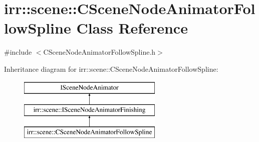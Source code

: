 \hypertarget{classirr_1_1scene_1_1_c_scene_node_animator_follow_spline}{\section{irr\-:\-:scene\-:\-:C\-Scene\-Node\-Animator\-Follow\-Spline Class Reference}
\label{classirr_1_1scene_1_1_c_scene_node_animator_follow_spline}
}


{\ttfamily \#include $<$C\-Scene\-Node\-Animator\-Follow\-Spline.\-h$>$}

Inheritance diagram for irr\-:\-:scene\-:\-:C\-Scene\-Node\-Animator\-Follow\-Spline\-:\begin{figure}[H]
\begin{center}
\leavevmode
\includegraphics[height=3.000000cm]{classirr_1_1scene_1_1_c_scene_node_animator_follow_spline}
\end{center}
\end{figure}
